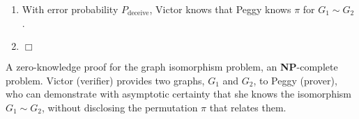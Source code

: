 \begin{table}[!htbp]
\begin{mdframed}[innertopmargin=3pt, innerbottommargin=3pt, nobreak]
{\begin{enumerate}
\begin{align}
		P_\text{deceive} = \frac{1}{2^n}	.
	\end{align}
	\item With error probability $P_\text{deceive}$, Victor knows that Peggy knows $\pi$ for \mbox{$G_1\sim G_2$}.
	\item $\Box$
\end{enumerate}}
\end{mdframed}
\captionspacealg \caption{A zero-knowledge proof for the graph isomorphism problem, an \textbf{NP}-complete problem. Victor (verifier) provides two graphs, $G_1$ and $G_2$, to Peggy (prover), who can demonstrate with asymptotic certainty that she knows the isomorphism \mbox{$G_1\sim G_2$}, without disclosing the permutation $\pi$ that relates them.} \label{alg:ZKP_graph}
\end{table}

